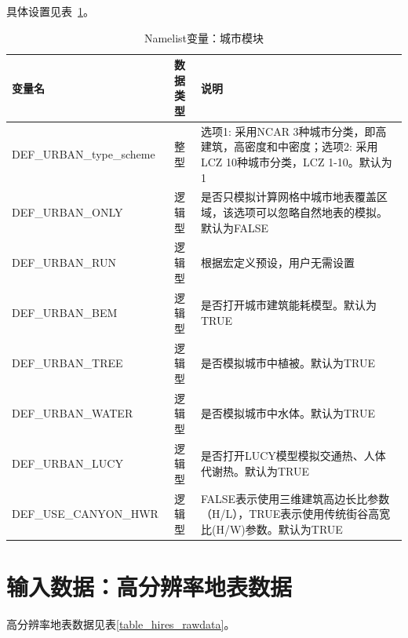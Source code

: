 \documentclass[a4paper,12pt,twoside]{article}
\begin{document}
具体设置见表~\ref{table_nl_urban}。
\begin{table}[!htb] \small
\caption{Namelist变量：城市模块}
\label{table_nl_urban}
\centering \renewcommand{\arraystretch}{1.5}
\begin{tabular}{lcp{}}
\toprule
\textbf{变量名} & \textbf{数据类型} & \textbf{说明}\\\midrule
DEF\_URBAN\_type\_scheme & 整型 & 选项1: 采用NCAR 3种城市分类，即高建筑，高密度和中密度；选项2: 采用LCZ 10种城市分类，LCZ 1-10。默认为1\\
DEF\_URBAN\_ONLY & 逻辑型 & 是否只模拟计算网格中城市地表覆盖区域，该选项可以忽略自然地表的模拟。默认为FALSE\\
DEF\_URBAN\_RUN & 逻辑型 & 根据宏定义预设，用户无需设置\\
DEF\_URBAN\_BEM & 逻辑型 & 是否打开城市建筑能耗模型。默认为TRUE\\
DEF\_URBAN\_TREE & 逻辑型 & 是否模拟城市中植被。默认为TRUE\\
DEF\_URBAN\_WATER & 逻辑型 & 是否模拟城市中水体。默认为TRUE\\
DEF\_URBAN\_LUCY & 逻辑型 & 是否打开LUCY模型模拟交通热、人体代谢热。默认为TRUE\\
DEF\_USE\_CANYON\_HWR & 逻辑型 & FALSE表示使用三维建筑高边长比参数（H/L），TRUE表示使用传统街谷高宽比(H/W)参数。默认为TRUE \\
\bottomrule
\end{tabular} 
\end{table}
\clearpage

\section{输入数据：高分辨率地表数据} \label{landdata}

高分辨率地表数据见表\ref{table_hires_rawdata}。
\end{document}
